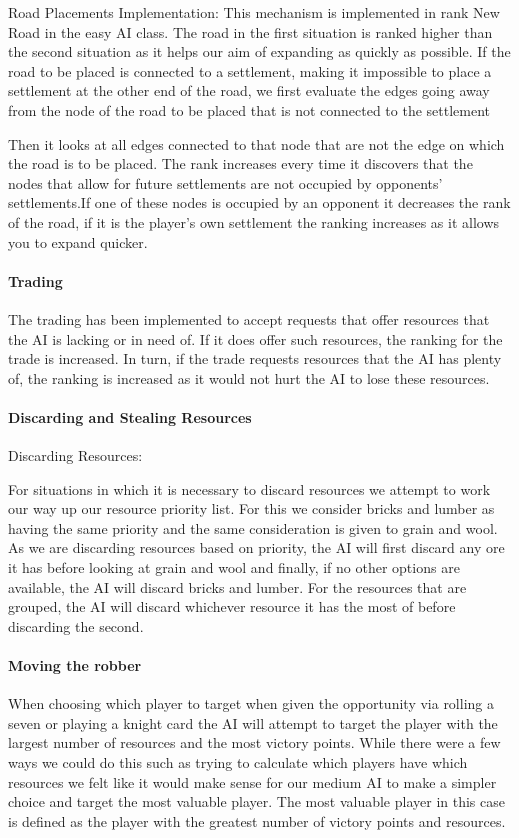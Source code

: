 \documentclass[a4paper,doc,draftfirst]{apa6}
\begin{document}
Road Placements Implementation:
	This mechanism is implemented in rank New Road in the easy AI class. The road in the first situation is ranked higher than the second situation as it helps our aim of expanding as quickly as possible. If the road to be placed is connected to a settlement, making it impossible to place a settlement at the other end of the road, we first evaluate the edges going away from the node of the road to be placed that is not connected to the settlement

Then it looks at all edges connected to that node that are not the edge on which the road is to be placed. The rank increases every time it discovers that the nodes that allow for future settlements are not occupied by opponents’ settlements.If one of these nodes is occupied by an opponent it decreases the rank of the road, if it is the player’s own settlement the ranking increases as it allows you to expand quicker.

\paragraph{Trading}
The trading has been implemented to accept requests that offer resources that the AI is lacking or in need of. If it does offer such resources, the ranking for the trade is increased. In turn, if the trade requests resources that the AI has plenty of, the ranking is increased as it would not hurt the AI to lose these resources.


\paragraph{Discarding and Stealing Resources}
Discarding Resources:

For situations in which it is necessary to discard resources we attempt to work our way up our resource priority list. For this we consider bricks and lumber as having the same priority and the same consideration is given to grain and wool. As we are discarding resources based on priority, the AI will first discard any ore it has before looking at grain and wool and finally, if no other options are available, the AI will discard bricks and lumber. For the resources that are grouped, the AI will discard whichever resource it has the most of before discarding the second.

\paragraph{Moving the robber}
When choosing which player to target when given the opportunity via rolling a seven or playing a knight card the AI will attempt to target the player with the largest number of resources and the most victory points. While there were a few ways we could do this such as trying to calculate which players have which resources we felt like it would make sense for our medium AI to make a simpler choice and target the most valuable player. The most valuable player in this case is defined as the player with the greatest number of victory points and resources.
\end{document}
